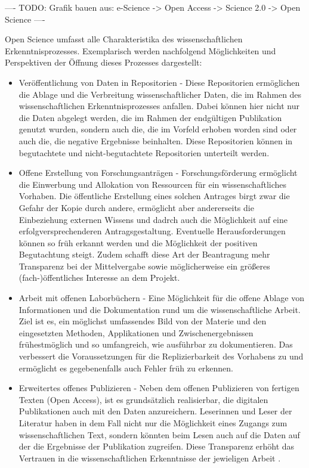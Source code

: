 ---- TODO: Grafik bauen aus: e-Science -> Open Access -> Science 2.0 -> Open Science ----

Open Science umfasst alle Charakteristika des wissenschaftlichen Erkenntnisprozesses. Exemplarisch werden nachfolgend Möglichkeiten und Perspektiven der Öffnung dieses Prozesses dargestellt:
\begin{itemize}
\item Veröffentlichung von Daten in Repositorien - Diese Repositorien ermöglichen die Ablage und die Verbreitung wissenschaftlicher Daten, die im Rahmen des wissenschaftlichen Erkenntnisprozesses anfallen. Dabei können hier nicht nur die Daten abgelegt werden, die im Rahmen der endgültigen Publikation genutzt wurden, sondern auch die, die im Vorfeld erhoben worden sind oder auch die, die negative Ergebnisse beinhalten. Diese Repositorien können in begutachtete und nicht-begutachtete Repositorien unterteilt werden.
\item Offene Erstellung von Forschungsanträgen - Forschungsförderung ermöglicht die Einwerbung und Allokation von Ressourcen für ein wissenschaftliches Vorhaben. Die öffentliche Erstellung eines solchen Antrages birgt zwar die Gefahr der Kopie durch andere, ermöglicht aber andererseits die Einbeziehung externen Wissens und dadrch auch die Möglichkeit auf eine erfolgversprechenderen Antragsgestaltung. Eventuelle Herausforderungen können so früh erkannt werden und die Möglichkeit der positiven Begutachtung steigt. Zudem schafft diese Art der Beantragung mehr Transparenz bei der Mittelvergabe sowie möglicherweise ein größeres (fach-)öffentliches Interesse an dem Projekt.
\item Arbeit mit offenen Laborbüchern - Eine Möglichkeit für die offene Ablage von Informationen und die Dokumentation rund um die wissenschaftliche Arbeit. Ziel ist es, ein möglichst umfassendes Bild von der Materie und den eingesetzten Methoden, Applikationen und Zwischenergebnissen frühestmöglich und so umfangreich, wie ausführbar zu dokumentieren. Das verbessert die Voraussetzungen für die Replizierbarkeit des Vorhabens zu und ermöglicht es gegebenenfalls auch Fehler früh zu erkennen.
\item Erweitertes offenes Publizieren - Neben dem offenen Publizieren von fertigen Texten (Open Access), ist es grundsätzlich realisierbar, die digitalen Publikationen auch mit den Daten anzureichern. Leserinnen und Leser der Literatur haben in dem Fall nicht nur die Möglichkeit eines Zugangs zum wissenschaftlichen Text, sondern könnten beim Lesen auch auf die Daten auf der die Ergebnisse der Publikation zugreifen. Diese Transparenz erhöht das Vertrauen in die wissenschaftlichen Erkenntnisse der jewieligen Arbeit \cite{Nosek_2015}.

\end{itemize}
